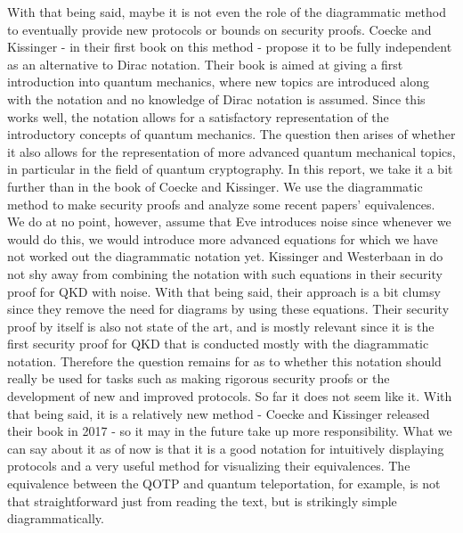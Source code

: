 \documentclass[]{article}
\begin{document}
With that being said, maybe it is not even the role of the diagrammatic method to eventually provide new protocols or bounds on security proofs. Coecke and Kissinger - in their first book on this method - propose it to be fully independent as an alternative to Dirac notation. Their book is aimed at giving a first introduction into quantum mechanics, where new topics are introduced along with the notation and no knowledge of Dirac notation is assumed. Since this works well, the notation allows for a satisfactory representation of the introductory concepts of quantum mechanics. The question then arises of whether it also allows for the representation of more advanced quantum mechanical topics, in particular in the field of quantum cryptography. In this report, we take it a bit further than in the book of Coecke and Kissinger. We use the diagrammatic method to make security proofs and analyze some recent papers' equivalences. We do at no point, however, assume that Eve introduces noise since whenever we would do this, we would introduce more advanced equations for which we have not worked out the diagrammatic notation yet. Kissinger and Westerbaan in \cite{Kissinger2017} do not shy away from combining the notation with such equations in their security proof for QKD with noise. With that being said, their approach is a bit clumsy since they remove the need for diagrams by using these equations. Their security proof by itself is also not state of the art, and is mostly relevant since it is the first security proof for QKD that is conducted mostly with the diagrammatic notation. Therefore the question remains for as to whether this notation should really be used for tasks such as making rigorous security proofs or the development of new and improved protocols. So far it does not seem like it. With that being said, it is a relatively new method - Coecke and Kissinger released their book in 2017 \cite{Coecke2017} - so it may in the future take up more responsibility. What we can say about it as of now is that it is a good notation for intuitively displaying protocols and a very useful method for visualizing their equivalences. The equivalence between the QOTP and quantum teleportation, for example, is not that straightforward just from reading the text, but is strikingly simple diagrammatically. 
\end{document}
